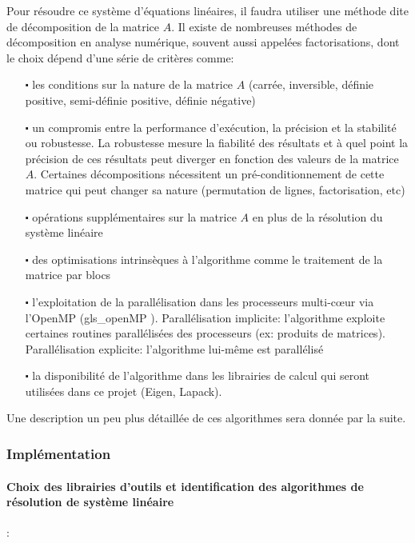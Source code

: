 \documentclass{report}
\begin{document}
Pour résoudre ce système d'équations linéaires, il faudra utiliser une méthode dite de décomposition de la matrice $A$. Il existe de nombreuses méthodes de décomposition en analyse numérique, souvent aussi appelées factorisations, dont le choix dépend d'une série de critères comme:
\begin{itemize}
\item[$\centerdot$] les conditions sur la nature de la matrice $A$ (carrée, inversible, définie positive, semi-définie positive, définie négative)
\item[$\centerdot$] un compromis entre la performance d'exécution, la précision et la stabilité ou robustesse. La robustesse mesure la fiabilité des résultats et à quel point la précision de ces résultats peut diverger en fonction des valeurs de la matrice $A$. Certaines décompositions nécessitent un pré-conditionnement de cette matrice qui peut changer sa nature (permutation de lignes, factorisation, etc)
\item[$\centerdot$] opérations supplémentaires sur la matrice $A$ en plus de la résolution du système linéaire
\item[$\centerdot$] des optimisations intrinsèques à l'algorithme comme le traitement de la matrice par blocs
\item[$\centerdot$] l'exploitation de la parallélisation dans les processeurs multi-cœur via l'OpenMP (\gls{gls_openMP} \cite{bib_openMpWikipedia} \cite{bib_openMPspecs}). Parallélisation implicite: l'algorithme exploite certaines routines parallélisées des processeurs (ex: produits de matrices). Parallélisation explicite: l'algorithme lui-même est parallélisé
\item[$\centerdot$] la disponibilité de l'algorithme dans les librairies de calcul qui seront utilisées dans ce projet (Eigen, Lapack).
\end{itemize}
\medskip
Une description un peu plus détaillée de ces algorithmes sera donnée par  la suite.

\subsubsection{Implémentation}


\paragraph{Choix des librairies d'outils et identification des algorithmes de résolution de système linéaire}:\\
\end{document}
